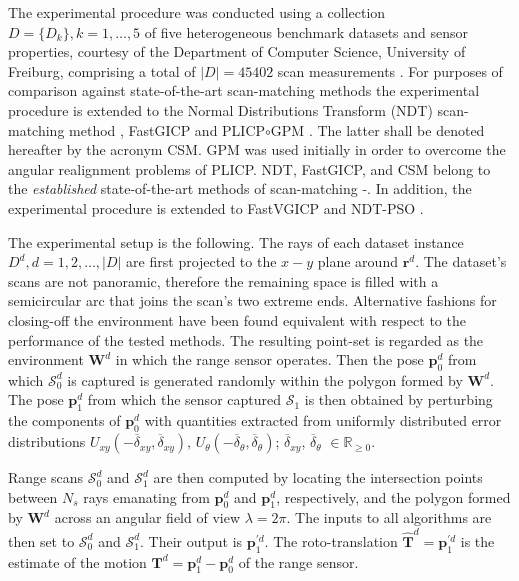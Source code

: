 The experimental procedure was conducted using a collection $D = \{D_k\}, k =
1,\dots,5$ of five heterogeneous benchmark datasets and sensor properties,
courtesy of the Department of Computer Science, University of Freiburg,
comprising a total of $|D| = 45402$ scan measurements \cite{dataset_link}.  For
purposes of comparison against state-of-the-art scan-matching methods the
experimental procedure is extended to the Normal Distributions Transform (NDT)
scan-matching method \cite{ndt1}, FastGICP \cite{fgicp} and PLICP$\circ$GPM
\cite{plicp}. The latter shall be denoted hereafter by the acronym CSM. GPM
\cite{gpm} was used initially in order to overcome the angular realignment
problems \cite{plicp} of PLICP. NDT, FastGICP, and CSM belong to the
\textit{established} state-of-the-art methods of scan-matching
\cite{vgicp}\cite{sota_leg_1}-\cite{sota_leg_5}. In addition, the experimental
procedure is extended to FastVGICP \cite{vgicp} and NDT-PSO \cite{ndt_pso}.

The experimental setup is the following. The rays of each dataset instance
$D^d, d = 1,2,\dots,|D|$ are first projected to the $x-y$ plane around
$\bm{r}^d$.  The dataset's scans are not panoramic, therefore the remaining
space is filled with a semicircular arc that joins the scan's two extreme ends.
Alternative fashions for closing-off the environment have been found equivalent
with respect to the performance of the tested methods. The resulting point-set
is regarded as the environment $\bm{W}^d$ in which the range sensor operates.
Then the pose $\bm{p}_0^d$ from which $\mathcal{S}_0^d$ is captured is
generated randomly within the polygon formed by $\bm{W}^d$. The pose
$\bm{p}_1^d$ from which the sensor captured $\mathcal{S}_1$ is then obtained by
perturbing the components of $\bm{p}_0^d$ with quantities extracted from
uniformly distributed error distributions $U_{xy}(-\overline{\delta}_{xy},
\overline{\delta}_{xy})$, $U_{\theta}(-\overline{\delta}_{\theta},
\overline{\delta}_{\theta})$; $\overline{\delta}_{xy}$,
$\overline{\delta}_\theta$ $\in \mathbb{R}_{\geq 0}$.

Range scans $\mathcal{S}_0^d$ and $\mathcal{S}_1^d$ are then computed by
locating the intersection points between $N_s$ rays emanating from $\bm{p}_0^d$
and $\bm{p}_1^d$, respectively, and the polygon formed by $\bm{W}^d$ across an
angular field of view $\lambda = 2\pi$. The inputs to all algorithms are
then set to $\mathcal{S}_0^d$ and $\mathcal{S}_1^d$. Their output is
$\bm{p}_1^{\prime d}$. The roto-translation
$\hat{\bm{T}}^d = \bm{p}_1^{\prime d}$ is the estimate of the motion
$\bm{T}^d = \bm{p}_1^d - \bm{p}_0^d$ of the range sensor.

